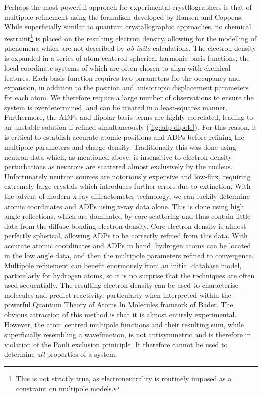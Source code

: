 \begin{refsection}
Perhaps the most powerful approach for experimental crystllographers is that of multipole refinement using the formalism developed by Hansen and Coppens.\autocite{Hansen1978}
While superficially similar to quantum crystallographic approaches, no chemical restraint\footnote{This is not strictly true, as electroneutrality is routinely imposed as a constraint on multipole models.} is placed on the resulting electron density, allowing for the modelling of phenomena which are not described by \emph{ab inito} calculations.
The electron density is expanded in a series of atom-centered spherical harmonic basis functions, the local coordinate systems of which are often chosen to align with chemical features.
Each basis function requires two parameters for the occupancy and expansion, in addition to the position and anisotropic displacement parameters for each atom.
We therefore require a large number of observations to ensure the system is overdetermined, and can be treated in a least-squares manner.
Furthermore, the ADPs and dipolar basis terms are highly correlated, leading to an unstable solution if refined simultaneously (\cref{fig:adp-dipole}).
For this reason, it is critical to establish accurate atomic positions and ADPs before refining the multipole parameters and charge density.
Traditionally this was done using neutron data which, as mentioned above, is insensitive to electron density perturbations as neutrons are scattered almost exclusively by the nucleus.
Unfortunately neutron sources are notoriously expensive and low-flux, requiring extremely large crystals which introduces further errors due to extinction.
With the advent of modern x-ray diffractometer technology, we can luckily determine atomic coordinates and ADPs using x-ray data alone.
This is done using high angle reflections, which are dominated by core scattering and thus contain little data from the diffuse bonding electron density.
Core electron density is almost perfectly spherical, allowing ADPs to be correctly refined from this data.
With accurate atomic coordinates and ADPs in hand, hydrogen atoms can be located in the low angle data, and then the multipole parameters refined to convergence.
Multipole refinement can benefit enormously from an initial database model, particularly for hydrogen atoms, so it is no surprise that the techniques are often used sequentially.\autocite{mopro,xd}
The resulting electron density can be used to characterise molecules and predict reactivity, particularly when interpreted within the powerful Quantum Theory of Atoms In Molecules frameork of Bader.\autocite{Bader1991}
The obvious attraction of this method is that it is almost entirely experimental.
However, the atom centred multipole functions and their resulting sum, while superficially resembling a wavefunction, is not antisymmetric and is therefore in violation of the Pauli exclusion priniciple.
It therefore cannot be used to determine \emph{all} properties of a system.


\end{refsection}
